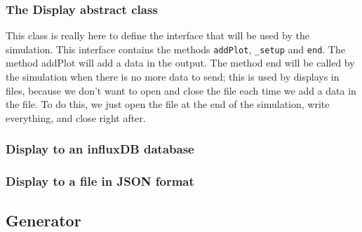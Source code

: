 \subsubsection{The Display abstract class}

This class is really here to define the interface that will be used
by the simulation. This interface contains the methods \verb!addPlot!,
\verb!_setup! and \verb!end!. The method addPlot will add a data in the
output. The method end will be called by the simulation when there is no more
data to send; this is used by displays in files, because we don't want to open
and close the file each time we add a data in the file. To do this, we just
open the file at the end of the simulation, write everything, and close right
after.

\subsubsection{Display to an influxDB database}


\subsubsection{Display to a file in JSON format}



\subsection{Generator}

